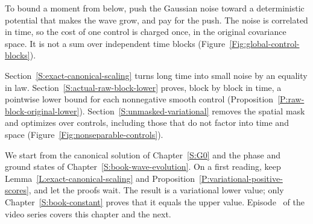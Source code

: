 To bound a moment from below, push the Gaussian noise toward a deterministic
potential that makes the wave grow, and pay for the push. The noise is
correlated in time, so the cost of one control is charged once, in the
original covariance space. It is not a sum over independent time blocks
(Figure~\ref{Fig:global-control-blocks}).

Section~\ref{S:exact-canonical-scaling} turns long time into small
noise by an equality in law. Section~\ref{S:actual-raw-block-lower}
proves, block by block in time, a pointwise lower bound for each
nonnegative smooth control (Proposition~\ref{P:raw-block-original-lower}).
Section~\ref{S:unmasked-variational} removes the spatial mask and optimizes
over controls, including those that do not factor into time and space
(Figure~\ref{Fig:nonseparable-controls}).

We start from the canonical solution of Chapter~\ref{S:G0} and the
phase and ground states of Chapter~\ref{S:book-wave-evolution}. On
a first reading, keep Lemma~\ref{L:exact-canonical-scaling} and
Proposition~\ref{P:variational-positive-scores}, and let the proofs wait. The
result is a variational lower value; only Chapter~\ref{S:book-constant}
proves that it equals the upper value. Episode~
of the video series covers this chapter and the next.
